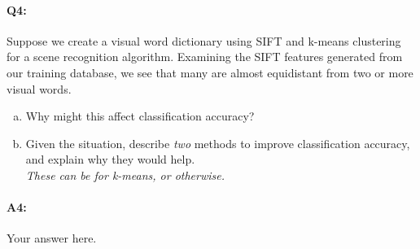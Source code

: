 





\pagebreak
\paragraph{Q4:} Suppose we create a visual word dictionary using SIFT and k-means clustering for a scene recognition algorithm. Examining the SIFT features generated from our training database, we see that many are almost equidistant from two or more visual words. 
\begin{enumerate}[(a)]
    \item 
    Why might this affect classification accuracy?

    \item
    Given the situation, describe \emph{two} methods to improve classification accuracy, and explain why they would help.\\ 
    \emph{These can be for k-means, or otherwise.}

\end{enumerate}


\paragraph{A4:} Your answer here.




